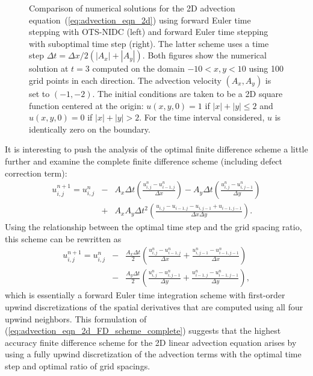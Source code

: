 \documentclass[fleqn,12pt,twoside]{article}
\newcommand{\bea}{\begin{eqnarray}}
\newcommand{\eea}{\end{eqnarray}}
\def\dt{\Delta t}
\def\dx{\Delta x}
\def\dy{\Delta y}
\begin{document}
\begin{figure}[tb]
\begin{center}
\caption{Comparison of numerical solutions for the 2D advection
equation~(\ref{eq:advection_eqn_2d}) using forward Euler time stepping 
with OTS-NIDC (left) and forward Euler time 
stepping with suboptimal time step (right).  The latter scheme uses a 
time step $\Delta t = \Delta x / 2 (|A_x|+|A_y|)$.  
Both figures show the numerical solution at $t = 3$ computed on the domain 
$-10 < x,y < 10$ using 100 grid points in each direction.
The advection velocity $(A_x, A_y)$ is set to $(-1, -2)$.  The initial 
conditions are taken to be a 2D square function centered at the
origin: $u(x,y,0) = 1$ if $|x| + |y| \le 2$ and 
$u(x,y,0) = 0$ if $|x| + |y| > 2$. 
For the time interval considered, $u$ is identically zero 
on the boundary.
}
\label{fig:advection_eqn_2d_soln}
\end{center}
\end{figure}

It is interesting to push the analysis of the optimal finite difference 
scheme a little further and examine the complete finite difference scheme
(including defect correction term):
\bea
  u^{n+1}_{i,j} = u^{n}_{i,j}
  &-& A_x \dt \left( \frac{u^{n}_{i,j} - u^{n}_{i-1,j}}{\dx} \right)
  - A_y \dt \left( \frac{u^{n}_{i,j} - u^{n}_{i,j-1}}{\dy} \right)
  \nonumber \\
  &+& A_x A_y \dt^2 
        \left( \frac{u_{i,j} - u_{i-1,j} - u_{i,j-1} + u_{i-1,j-1}}
                    {\dx \dy} 
        \right).
  \label{eq:advection_eqn_2d_FD_scheme_complete}
\eea
Using the relationship between the optimal time step and the grid spacing
ratio, this scheme can be rewritten as
\bea
  u^{n+1}_{i,j} = u^{n}_{i,j}
  &-& \frac{A_x \dt}{2}
    \left( \frac{u^{n}_{i,j} - u^{n}_{i-1,j}}{\dx} 
         + \frac{u^{n}_{i,j-1} - u^{n}_{i-1,j-1}}{\dx} 
    \right)
  \nonumber \\
  &-& \frac{A_y \dt}{2}
    \left( \frac{u^{n}_{i,j} - u^{n}_{i,j-1}}{\dy} 
         + \frac{u^{n}_{i-1,j} - u^{n}_{i-1,j-1}}{\dy} 
    \right),
  \label{eq:advection_eqn_2d_FD_scheme_simplified}
\eea
which is essentially a forward Euler time integration scheme with 
first-order upwind discretizations of the spatial derivatives that are 
computed using all four upwind neighbors.  This formulation of 
(\ref{eq:advection_eqn_2d_FD_scheme_complete}) suggests that the highest
accuracy finite difference scheme for the 2D linear advection equation arises
by using a fully upwind discretization of the advection terms with the 
optimal time step and optimal ratio of grid spacings.
\end{document}
